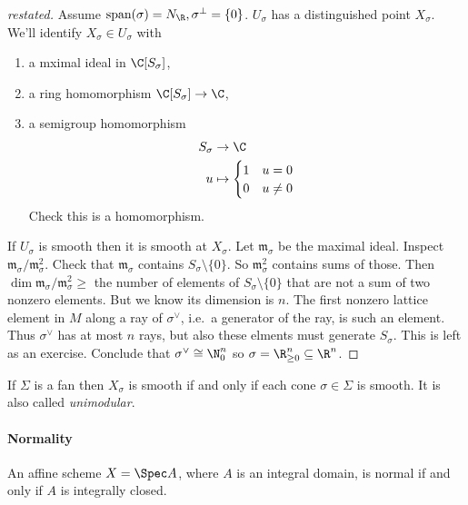 \documentclass[a4paper]{article}
\begin{document}
\begin{proof}[restated]
  Assume \(\text{span}(\sigma) = N_\R, \sigma^\perp = \{0\}\). \(U_\sigma\) has a distinguished point \(X_\sigma\). We'll identify \(X_\sigma \in U_\sigma\) with
  \begin{enumerate}
  \item a mximal ideal in \(\C[S_\sigma]\),
  \item a ring homomorphism \(\C[S_\sigma] \to \C\),
  \item a semigroup homomorphism
    \begin{align*}
      S_\sigma &\to \C \\
      u &\mapsto
          \begin{cases}
            1 & u = 0 \\
            0 & u \neq 0
          \end{cases}
    \end{align*} 
    Check this is a homomorphism.
  \end{enumerate}
  If \(U_\sigma\) is smooth then it is smooth at \(X_\sigma\). Let \(\mathfrak m_\sigma\) be the maximal ideal. Inspect \(\mathfrak m_\sigma/\mathfrak m_\sigma^2\). Check that \(\mathfrak m_\sigma\) contains \(S_\sigma \setminus \{0\}\). So \(\mathfrak m_\sigma^2\) contains sums of those. Then \(\dim \mathfrak m_\sigma/\mathfrak m_\sigma^2 \geq\) the number of elements of \(S_\sigma \setminus \{0\}\) that are not a sum of two nonzero elements. But we know its dimension is \(n\). The first nonzero lattice element in \(M\) along a ray of \(\sigma^\vee\), i.e.\ a generator of the ray, is such an element. Thus \(\sigma^\vee\) has at most \(n\) rays, but also these elments must generate \(S_\sigma\). This is left as an exercise. Conclude that \(\sigma^\vee \cong \N_0^n\) so \(\sigma = \R^n_{\geq 0} \subseteq \R^n\).
\end{proof}

\begin{corollary}
  If \(\Sigma\) is a fan then \(X_\sigma\) is smooth if and only if each cone \(\sigma \in \Sigma\) is smooth. It is also called \emph{unimodular}.
\end{corollary}

\paragraph{Normality}

An affine scheme \(X = \Spec A\), where \(A\) is an integral domain, is normal if and only if \(A\) is integrally closed.
\end{document}
